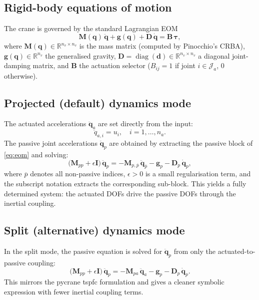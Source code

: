 \documentclass[11pt, a4paper]{article}
\newcommand{\R}{\mathbb{R}}
\newcommand{\qd}{\bm{q}}          %
\newcommand{\dqd}{\dot{\bm{q}}}   %
\newcommand{\ddqd}{\ddot{\bm{q}}} %
\newcommand{\diag}{\operatorname{diag}}
\begin{document}
\subsection{Rigid-body equations of motion}

The crane is governed by the standard Lagrangian EOM
\begin{equation}
  \bm{M}(\qd)\,\ddqd + \bm{g}(\qd) + \bm{D}\,\dqd = \bm{B}\,\bm{\tau},
  \label{eq:eom}
\end{equation}
where $\bm{M}(\qd) \in \R^{n_v \times n_v}$ is the mass matrix (computed by Pinocchio's
CRBA), $\bm{g}(\qd) \in \R^{n_v}$ the generalised gravity, $\bm{D} =
\diag(\bm{d}) \in \R^{n_v \times n_v}$ a diagonal joint-damping matrix, and $\bm{B}$
the actuation selector ($B_{ij} = 1$ if joint $i \in \mathcal{J}_a$, 0 otherwise).

\subsection{Projected (default) dynamics mode}

The actuated accelerations $\ddot{\bm{q}}_a$ are set directly from the input:
\begin{equation}
  \ddot{q}_{a,i} = u_i, \quad i = 1,\dots,n_a.
\end{equation}
The passive joint accelerations $\ddot{\bm{q}}_p$ are obtained by extracting the
passive block of \eqref{eq:eom} and solving:
\begin{equation}
  \bigl(\bm{M}_{pp} + \epsilon \bm{I}\bigr)\,\ddot{\bm{q}}_p
  = -\bm{M}_{p,\overline{p}}\,\ddot{\bm{q}}_{\overline{p}}
    - \bm{g}_p - \bm{D}_p\,\dqd_p,
  \label{eq:passive_acc}
\end{equation}
where $\overline{p}$ denotes all non-passive indices, $\epsilon > 0$ is a small
regularisation term, and the subscript notation extracts the corresponding sub-block.
This yields a fully determined system: the actuated DOFs drive the passive DOFs through
the inertial coupling.

\subsection{Split (alternative) dynamics mode}

In the split mode, the passive equation is solved for $\ddot{\bm{q}}_p$ from only the
actuated-to-passive coupling:
\begin{equation}
  \bigl(\bm{M}_{pp} + \epsilon \bm{I}\bigr)\,\ddot{\bm{q}}_p
  = -\bm{M}_{pa}\,\ddot{\bm{q}}_a - \bm{g}_p - \bm{D}_p\,\dqd_p.
\end{equation}
This mirrors the pycrane tspfc formulation and gives a cleaner symbolic expression with
fewer inertial coupling terms.
\end{document}
